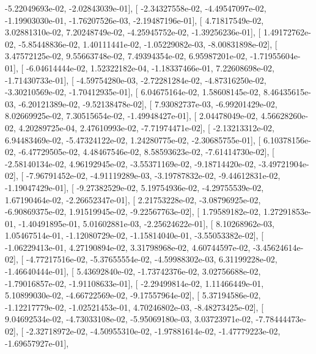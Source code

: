 \documentclass{article}
\begin{document}
         -5.22049693e-02,  -2.02843039e-01],
       [ -2.34327558e-02,  -4.49547097e-02,  -1.19903030e-01,
         -1.76207526e-03,  -2.19487196e-01],
       [  4.71817549e-02,   3.02881310e-02,   7.20248749e-02,
         -4.25945752e-02,  -1.39256236e-01],
       [  1.49172762e-02,  -5.85448836e-02,   1.40111441e-02,
         -1.05229082e-03,  -8.00831898e-02],
       [  3.47572125e-02,   9.55663748e-02,   7.49394354e-02,
          6.95987201e-02,  -1.71955604e-01],
       [ -6.04614444e-02,   1.52322182e-04,  -1.18337466e-01,
          7.22608698e-02,  -1.71430733e-01],
       [ -4.59754280e-03,  -2.72281284e-02,  -4.87316250e-02,
         -3.30210569e-02,  -1.70412935e-01],
       [  6.04675164e-02,   1.58608145e-02,   8.46435615e-03,
         -6.20121389e-02,  -9.52138478e-02],
       [  7.93082737e-03,  -6.99201429e-02,   8.02669925e-02,
          7.30515654e-02,  -1.49948427e-01],
       [  2.04478049e-02,   4.56628260e-02,   4.20289725e-04,
          2.47610993e-02,  -7.71974471e-02],
       [ -2.13213312e-02,   6.94483469e-02,  -5.47324122e-02,
          1.24280775e-02,  -2.30685755e-01],
       [  6.10378156e-02,  -6.47729505e-02,   4.48467546e-02,
          8.58593623e-02,  -7.61414730e-02],
       [ -2.58140134e-02,   4.96192945e-02,  -3.55371169e-02,
         -9.18714420e-02,  -3.49721904e-02],
       [ -7.96791452e-02,  -4.91119289e-03,  -3.19787832e-02,
         -9.44612831e-02,  -1.19047429e-01],
       [ -9.27382529e-02,   5.19754936e-02,  -4.29755539e-02,
          1.67190464e-02,  -2.26652347e-01],
       [  2.21753228e-02,  -3.08796925e-02,  -6.90869375e-02,
          1.91519945e-02,  -9.22567763e-02],
       [  1.79589182e-02,   1.27291853e-01,  -1.40491895e-01,
          5.01602881e-03,  -2.25624622e-01],
       [  8.10268962e-03,   1.05467514e-01,  -1.12080729e-02,
         -1.15814040e-01,  -3.55053382e-02],
       [ -1.06229413e-01,   4.27190894e-02,   3.31798968e-02,
          4.60744597e-02,  -3.45624614e-02],
       [ -4.77217516e-02,  -5.37655554e-02,  -4.59988302e-03,
          6.31199228e-02,  -1.46640444e-01],
       [  5.43692840e-02,  -1.73742376e-02,   3.02756688e-02,
         -1.79016857e-02,  -1.91108633e-01],
       [ -2.29499814e-02,   1.11466449e-01,   5.10899030e-02,
         -4.66722569e-02,  -9.17557964e-02],
       [  5.37194586e-02,  -1.12217779e-02,  -1.02521453e-01,
          4.70246802e-03,  -8.48273425e-02],
       [  9.04692534e-02,  -4.73033108e-02,  -5.95069180e-03,
          3.03723971e-02,  -7.78444473e-02],
       [ -2.32718972e-02,  -4.50955310e-02,  -1.97881614e-02,
         -1.47779223e-02,  -1.69657927e-01],
\end{document}
